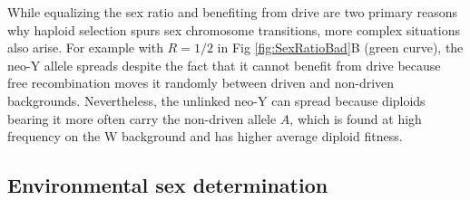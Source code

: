 \documentclass[10pt,letterpaper]{article}
\providecommand{\DIFaddend}{} %
\begin{document}
\DIFaddend %
%

While equalizing the sex ratio and benefiting from drive are two primary reasons why haploid selection spurs sex chromosome transitions, more complex situations also arise.  
For example with $R=1/2$ in Fig \ref{fig:SexRatioBad}B (green curve), the neo-Y allele spreads despite the fact that it cannot benefit from drive because free recombination moves it randomly between driven and non-driven backgrounds.  
Nevertheless, the unlinked neo-Y can spread because diploids bearing it more often carry the non-driven allele $A$, which is found at high frequency on the W background and has higher average diploid fitness.%


\subsection*{Environmental sex determination}
\end{document}
